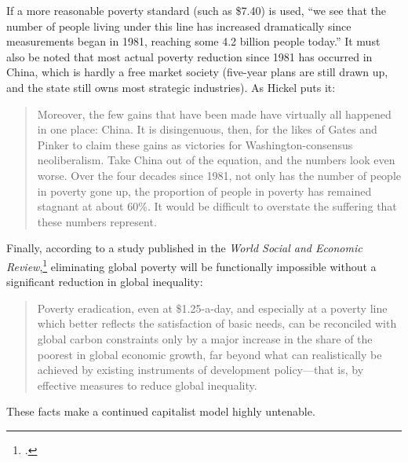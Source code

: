 If a more reasonable poverty standard (such as \$7.40) is used, ``we see that the number of people living under this line has increased dramatically since measurements began in 1981, reaching some 4.2 billion people today.''
It must also be noted that most actual poverty reduction since 1981 has occurred in China, which is hardly a free market society (five-year plans are still drawn up, and the state still owns most strategic industries).
As Hickel puts it:

\begin{quote}
Moreover, the few gains that have been made have virtually all happened in one place: China.
It is disingenuous, then, for the likes of Gates and Pinker to claim these gains as victories for Washington-consensus neoliberalism.
Take China out of the equation, and the numbers look even worse.
Over the four decades since 1981, not only has the number of people in poverty gone up, the proportion of people in poverty has remained stagnant at about 60\%.
It would be difficult to overstate the suffering that these numbers represent.
\end{quote}

Finally, according to a study published in the \textit{World Social and Economic Review},\footcite{incrementum} eliminating global poverty will be functionally impossible without a significant reduction in global inequality:

\begin{quote}
Poverty eradication, even at \$1.25-a-day, and especially at a poverty line which better reflects the satisfaction of basic needs, can be reconciled with global carbon constraints only by a major increase in the share of the poorest in global economic growth, far beyond what can realistically be achieved by existing instruments of development policy---that is, by effective measures to reduce global inequality.
\end{quote}

These facts make a continued capitalist model highly untenable.
